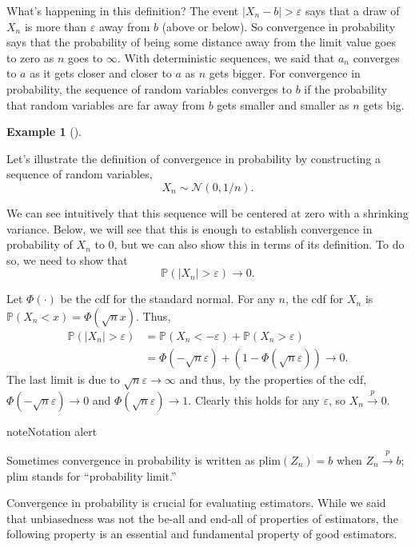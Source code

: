 \documentclass[
  13pt,
  letterpaper,
  DIV=11,
  numbers=noendperiod]{scrreprt}
\newcommand{\N}{\mathcal{N}}
\renewcommand{\P}{\mathbb{P}}
\newcommand{\inprob}{\overset{p}{\to}}
\theoremstyle{plain}
\theoremstyle{plain}
\theoremstyle{definition}
\theoremstyle{definition}
\newtheorem{example}{Example}[chapter]
\theoremstyle{remark}
\begin{document}
What's happening in this definition? The event
\(|X_n - b| > \varepsilon\) says that a draw of \(X_n\) is more than
\(\varepsilon\) away from \(b\) (above or below). So convergence in
probability says that the probability of being some distance away from
the limit value goes to zero as \(n\) goes to \(\infty\). With
deterministic sequences, we said that \(a_n\) converges to \(a\) as it
gets closer and closer to \(a\) as \(n\) gets bigger. For convergence in
probability, the sequence of random variables converges to \(b\) if the
probability that random variables are far away from \(b\) gets smaller
and smaller as \(n\) gets big.

\begin{example}[]\protect\hypertarget{exm-inprob}{}\label{exm-inprob}

Let's illustrate the definition of convergence in probability by
constructing a sequence of random variables, \[
X_n \sim \N(0, 1/n).
\]

We can see intuitively that this sequence will be centered at zero with
a shrinking variance. Below, we will see that this is enough to
establish convergence in probability of \(X_n\) to 0, but we can also
show this in terms of its definition. To do so, we need to show that \[
\P(|X_n| > \varepsilon) \to 0.
\]

Let \(\Phi(\cdot)\) be the cdf for the standard normal. For any \(n\),
the cdf for \(X_n\) is \(\P(X_{n} < x) = \Phi(\sqrt{n}x)\). Thus, \[
\begin{aligned}
\P(|X_n| > \varepsilon) &= \P(X_n < -\varepsilon) + \P(X_n > \varepsilon) \\ &= \Phi(-\sqrt{n}\varepsilon) + (1 - \Phi(\sqrt{n}\varepsilon)) \to 0.
\end{aligned}
\] The last limit is due to \(\sqrt{n}\varepsilon \to \infty\) and thus,
by the properties of the cdf, \(\Phi(-\sqrt{n}\varepsilon) \to 0\) and
\(\Phi(\sqrt{n}\varepsilon) \to 1\). Clearly this holds for any
\(\varepsilon\), so \(X_n \inprob 0\).

\end{example}

\begin{bookcallout}{note}{Notation alert}

Sometimes convergence in probability is written as
\(\text{plim}(Z_n) = b\) when \(Z_n \inprob b\); \(\text{plim}\) stands
for ``probability limit.''

\end{bookcallout}

Convergence in probability is crucial for evaluating estimators. While
we said that unbiasedness was not the be-all and end-all of properties
of estimators, the following property is an essential and fundamental
property of good estimators.
\end{document}
